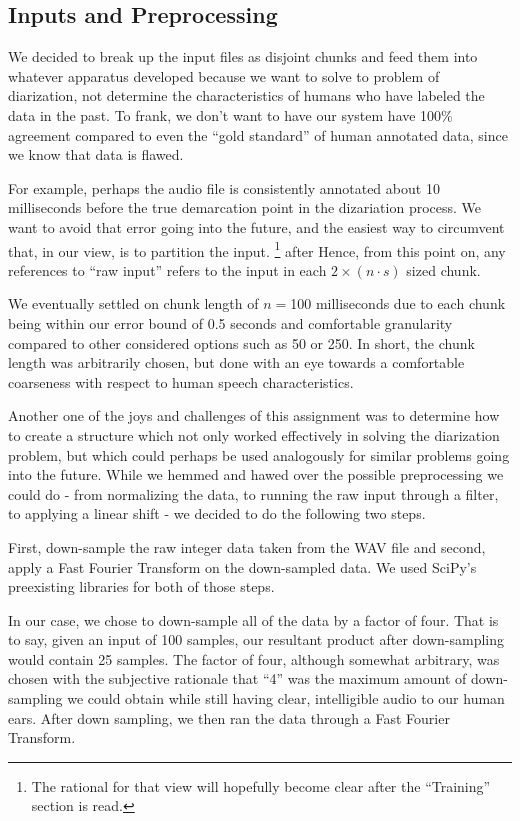 \documentclass[11pt]{article}
\begin{document}
 

\subsection{Inputs and Preprocessing}

We decided to break up the input files as disjoint chunks and feed them into whatever apparatus developed because we want to solve to problem of diarization, not determine the characteristics of humans who have labeled the data in the past. To frank, we don't want to have our system have 100\% agreement compared to even the ``gold standard'' of human annotated data, since we know that data is flawed.

For example, perhaps the audio file is consistently annotated about 10 milliseconds before the true demarcation point in the dizariation process. We want to avoid that error going into the future, and the easiest way to circumvent that, in our view, is to partition the input. \footnote{The rational for that view will hopefully become clear after the ``Training'' section is read.} after Hence, from this point on, any references to ``raw input'' refers to the input in each $2\times (n\cdot s)$ sized chunk.

We eventually settled on chunk length of $n=$100 milliseconds due to each chunk being within our error bound of 0.5 seconds and comfortable granularity compared to other considered options such as 50 or 250. In short, the chunk length was arbitrarily chosen, but done with an eye towards a comfortable coarseness with respect to human speech characteristics.

Another one of the joys and challenges of this assignment was to determine how to create a structure which not only worked effectively in solving the diarization problem, but which could perhaps be used analogously for similar problems going into the future. While we hemmed and hawed over the possible preprocessing we could do - from normalizing the data, to running the raw input through a filter, to applying a linear shift - we decided to do the following two steps.

First, down-sample the raw integer data taken from the WAV file and second, apply a Fast Fourier Transform on the down-sampled data. We used SciPy's preexisting libraries for both of those steps.

In our case, we chose to down-sample all of the data by a factor of four. That is to say, given an input of 100 samples, our resultant product after down-sampling would contain 25 samples. The factor of four, although somewhat arbitrary, was chosen with the subjective rationale that ``4'' was the maximum amount of down-sampling we could obtain while still having clear, intelligible audio to our human ears. After down sampling, we then ran the data through a Fast Fourier Transform.
\end{document}
